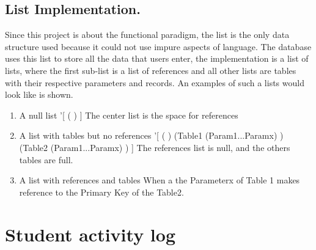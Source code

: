 \documentclass[12pt]{article}
\begin{document}
\begin{itemize}
\subsection{List Implementation.}
Since this project is about the functional paradigm, the list is the only data structure used because it could not use impure aspects of language. \newline
The database uses this list to store all the data that users enter, the implementation is a list of lists, where the first sub-list is a list of references and all other lists are tables with their respective parameters and records. An examples of such a lists would look like is shown.
\begin{enumerate}
\item A null list \newline
'[ ( ) ] \newline
The center list is the space for references
\item A list with tables but no references \newline
'[ ( ) (Table1 (Param1...Paramx) ) (Table2 (Param1...Paramx) ) ]\newline 
The references list is null, and the others tables are full.
\item A list with references and tables \newline
When a the Parameterx of Table 1 makes reference to the Primary Key of the Table2.


\end{enumerate}


\section{Student activity log}

\end{itemize}
\end{document}
